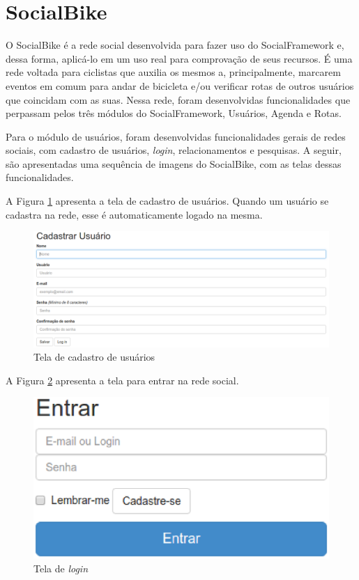 \section{SocialBike}
\label{sec:SocialBike}

O SocialBike é a rede social desenvolvida para fazer uso do SocialFramework e, dessa forma, aplicá-lo em um uso real para comprovação de seus recursos. É uma rede voltada para ciclistas que auxilia os mesmos a, principalmente, marcarem eventos em comum para andar de bicicleta e/ou verificar rotas de outros usuários que coincidam com as suas. Nessa rede, foram desenvolvidas funcionalidades que perpassam pelos três módulos do SocialFramework, Usuários, Agenda e Rotas.

Para o módulo de usuários, foram desenvolvidas funcionalidades gerais de redes sociais, com cadastro de usuários, \textit{login}, relacionamentos e pesquisas. A seguir, são apresentadas uma sequência de imagens do SocialBike, com as telas dessas funcionalidades.

A Figura \ref{cadastrar_usuario} apresenta a tela de cadastro de usuários. Quando um usuário se cadastra na rede, esse é automaticamente logado na mesma.

\begin{figure}[!h]
	\centering
	\includegraphics[scale=0.4]{figuras/resultados/cadastrar_usuario.eps}
	\caption[Tela de cadastro de usuários]{Tela de cadastro de usuários}
	\label{cadastrar_usuario}
\end{figure}

A Figura \ref{login} apresenta a tela para entrar na rede social.

\begin{figure}[!h]
	\centering
	\includegraphics[scale=0.5]{figuras/resultados/login.eps}
	\caption[Tela de login]{Tela de \textit{login}}
	\label{login}
\end{figure}

